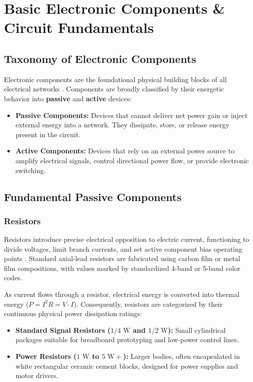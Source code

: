 \chapter{Basic Electronic Components \& Circuit Fundamentals}

\section{Taxonomy of Electronic Components}
Electronic components are the foundational physical building blocks of all electrical networks \cite{seymour_components, kalyanaraman_circuits}. Components are broadly classified by their energetic behavior into \textbf{passive} and \textbf{active} devices:

\begin{itemize}[leftmargin=1.5em]
    \item \textbf{Passive Components:} Devices that cannot deliver net power gain or inject external energy into a network. They dissipate, store, or release energy present in the circuit.
    \item \textbf{Active Components:} Devices that rely on an external power source to amplify electrical signals, control directional power flow, or provide electronic switching.
\end{itemize}

\section{Fundamental Passive Components}

\subsection{Resistors}
Resistors introduce precise electrical opposition to electric current, functioning to divide voltages, limit branch currents, and set active component bias operating points \cite{seymour_components}. Standard axial-lead resistors are fabricated using carbon film or metal film compositions, with values marked by standardized 4-band or 5-band color codes.

As current flows through a resistor, electrical energy is converted into thermal energy ($P = I^2 R = V \cdot I$). Consequently, resistors are categorized by their continuous physical power dissipation ratings:
\begin{itemize}[leftmargin=1.5em]
    \item \textbf{Standard Signal Resistors ($1/4\text{ W}$ and $1/2\text{ W}$):} Small cylindrical packages suitable for breadboard prototyping and low-power control lines.
    \item \textbf{Power Resistors ($1\text{ W}$ to $5\text{ W}+$):} Larger bodies, often encapsulated in white rectangular ceramic cement blocks, designed for power supplies and motor drivers.
\end{itemize}

